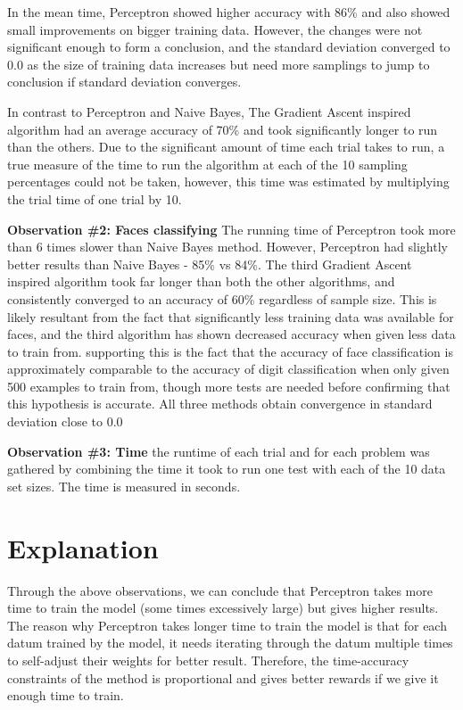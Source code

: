 \documentclass{article}
\begin{document}
In the mean time, Perceptron showed higher accuracy with 86\% and also showed small improvements on bigger training data. However, the changes were not significant enough to form a conclusion, and the standard deviation converged to 0.0 as the size of training data increases but need more samplings to jump to conclusion if standard deviation converges.

In contrast to Perceptron and Naive Bayes, The Gradient Ascent inspired algorithm had an average accuracy of 70\% and took significantly longer to run than the others. Due to the significant amount of time each trial takes to run, a true measure of the time to run the algorithm at each of the 10 sampling percentages could not be taken, however, this time was estimated by multiplying the trial time of one trial by 10. 


\textbf{Observation \#2: Faces classifying}
The running time of Perceptron took more than 6 times slower than Naive Bayes method. However, Perceptron had slightly better results than Naive Bayes - 85\% vs 84\%. The third Gradient Ascent inspired algorithm took far longer than both the other algorithms, and consistently converged to an accuracy of 60\% regardless of sample size. This is likely resultant from the fact that significantly less training data was available for faces, and the third algorithm has shown decreased accuracy when given less data to train from. supporting this is the fact that the accuracy of face classification is approximately comparable to the accuracy of digit classification when only given 500 examples to train from, though more tests are needed before confirming that this hypothesis is accurate. All three methods obtain convergence in standard deviation close to 0.0

\textbf{Observation \#3: Time}
the runtime of each trial and for each problem was gathered by combining the time it took to run one test with each of the 10 data set sizes. The time is measured in seconds.
\section{Explanation}
Through the above observations, we can conclude that Perceptron takes more time to train the model (some times excessively large) but gives higher results. The reason why Perceptron takes longer time to train the model is that for each datum trained by the model, it needs iterating through the datum multiple times to self-adjust their weights for better result. Therefore, the time-accuracy constraints of the method is proportional and gives better rewards if we give it enough time to train.
\end{document}
